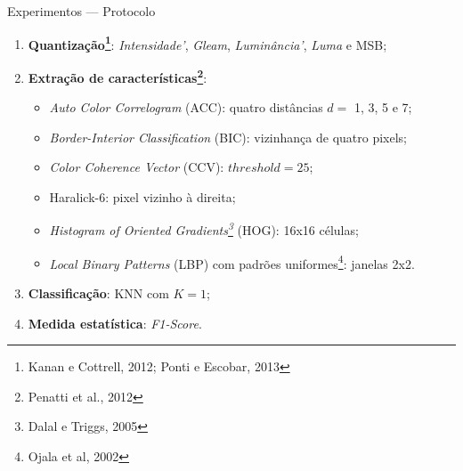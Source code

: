 \documentclass[10pt]{beamer}
\begin{document}
\begin{frame}{Experimentos --- Protocolo}
  \setlength\leftmargini{1em}
  \begin{block}{}
        \begin{enumerate}
      \item \textbf{Quantização\footnote{Kanan e Cottrell, 2012; Ponti e Escobar, 2013}}: \emph{Intensidade'}, \emph{Gleam}, \emph{Luminância'}, \emph{Luma} e MSB;
      \item \textbf{Extração de características\footnote{Penatti et al., 2012}}:
      \begin{itemize}
        \item \textit{Auto Color Correlogram} (ACC): quatro distâncias $d =$ 1, 3, 5 e 7;
        \item \textit{Border-Interior Classification} (BIC): vizinhança de quatro pixels;
        \item \textit{Color Coherence Vector} (CCV): $\mathit{threshold} = 25$;
        \item Haralick-6: pixel vizinho à direita;
        \item \textit{Histogram of Oriented Gradients\footnote{Dalal e
Triggs, 2005}} (HOG): 16x16 células;
        \item \textit{Local Binary Patterns} (LBP) com padrões uniformes\footnote{Ojala et al, 2002}: janelas 2x2.
      \end{itemize}
      \item \textbf{Classificação}: KNN com $K=1$;
      \item \textbf{Medida estatística}: \textit{F1-Score}.
    \end{enumerate}
  \end{block}
\end{frame}
\end{document}
